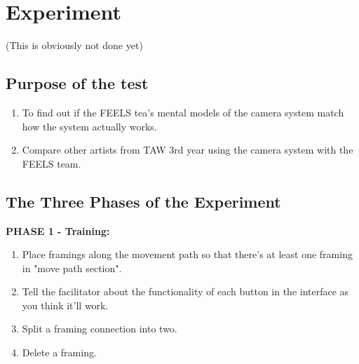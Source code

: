 \section{Experiment}



(This is obviously not done yet)

\subsection{Purpose of the test}
\begin{enumerate}
\item To find out if the FEELS tea's mental models of the camera system match how the system actually works.
\item Compare other artists from TAW 3rd year using the camera system with the FEELS team.
\end{enumerate}





\subsection{The Three Phases of the Experiment}
\textbf{PHASE 1 - Training:}
\begin{enumerate}
\item Place framings along the movement path so that there's at least one framing in "move path section".
\item Tell the facilitator about the functionality of each button in the interface as you think it'll work.
\item Split a framing connection into two.
\item Delete a framing.
\end{enumerate}

